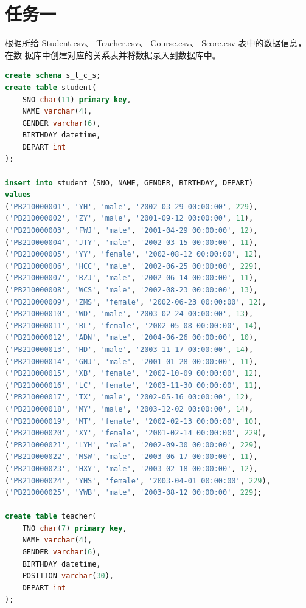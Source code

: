 \documentclass{ctexart}
\begin{document}
\section{任务一}
根据所给 Student.csv、 Teacher.csv、 Course.csv、 Score.csv 表中的数据信息，在数
据库中创建对应的关系表并将数据录入到数据库中。
\begin{lstlisting}[language=sql]
create schema s_t_c_s;  
create table student(
	SNO char(11) primary key,  
	NAME varchar(4),  
	GENDER varchar(6),  
	BIRTHDAY datetime,  
	DEPART int  
);  
  
insert into student (SNO, NAME, GENDER, BIRTHDAY, DEPART)  
values
('PB210000001', 'YH', 'male', '2002-03-29 00:00:00', 229),
('PB210000002', 'ZY', 'male', '2001-09-12 00:00:00', 11),
('PB210000003', 'FWJ', 'male', '2001-04-29 00:00:00', 12),
('PB210000004', 'JTY', 'male', '2002-03-15 00:00:00', 11),
('PB210000005', 'YY', 'female', '2002-08-12 00:00:00', 12),
('PB210000006', 'HCC', 'male', '2002-06-25 00:00:00', 229),
('PB210000007', 'RZJ', 'male', '2002-06-14 00:00:00', 11),
('PB210000008', 'WCS', 'male', '2002-08-23 00:00:00', 13),
('PB210000009', 'ZMS', 'female', '2002-06-23 00:00:00', 12),
('PB210000010', 'WD', 'male', '2003-02-24 00:00:00', 13),
('PB210000011', 'BL', 'female', '2002-05-08 00:00:00', 14),
('PB210000012', 'ADN', 'male', '2004-06-26 00:00:00', 10),
('PB210000013', 'HD', 'male', '2003-11-17 00:00:00', 14),
('PB210000014', 'GNJ', 'male', '2001-01-28 00:00:00', 11),
('PB210000015', 'XB', 'female', '2002-10-09 00:00:00', 12),
('PB210000016', 'LC', 'female', '2003-11-30 00:00:00', 11),
('PB210000017', 'TX', 'male', '2002-05-16 00:00:00', 12),
('PB210000018', 'MY', 'male', '2003-12-02 00:00:00', 14),
('PB210000019', 'MT', 'female', '2002-02-13 00:00:00', 10),
('PB210000020', 'XY', 'female', '2001-02-14 00:00:00', 229),
('PB210000021', 'LYH', 'male', '2002-09-30 00:00:00', 229),
('PB210000022', 'MSW', 'male', '2003-06-17 00:00:00', 11),
('PB210000023', 'HXY', 'male', '2003-02-18 00:00:00', 12),
('PB210000024', 'YHS', 'female', '2003-04-01 00:00:00', 229),
('PB210000025', 'YWB', 'male', '2003-08-12 00:00:00', 229);

create table teacher(
	TNO char(7) primary key,  
	NAME varchar(4),  
    GENDER varchar(6),  
    BIRTHDAY datetime,  
    POSITION varchar(30),  
    DEPART int  
);  
  

\end{lstlisting}
\end{document}
